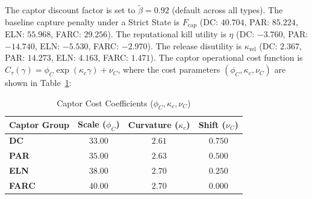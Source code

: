 \documentclass[12pt]{article}
\numberwithin{equation}{section}
\numberwithin{table}{section}
\begin{document}
The captor discount factor is set to $\tilde{\beta} = 0.92$ (default across all types). The baseline capture penalty under a Strict State is $F_{\text{cap}}$ (DC: $40.704$, PAR: $85.224$, ELN: $55.968$, FARC: $29.256$). The reputational kill utility is $\eta$ (DC: $-3.760$, PAR: $-14.740$, ELN: $-5.530$, FARC: $-2.970$). The release disutility is $\kappa_{\text{rel}}$ (DC: $2.367$, PAR: $14.273$, ELN: $4.163$, FARC: $1.471$). The captor operational cost function is $C_\tau(\gamma) = \phi_C \exp(\kappa_c \gamma) + \nu_C$, where the cost parameters $(\phi_C, \kappa_c, \nu_C)$ are shown in Table~\ref{tab:captor-cost-coefficients}:
\begin{table}[h!]
\centering
\caption{Captor Cost Coefficients ($\phi_C, \kappa_c, \nu_C$)}
\label{tab:captor-cost-coefficients}
\begin{tabular}{lccc}
\toprule
\textbf{Captor Group} & \textbf{Scale ($\phi_C$)} & \textbf{Curvature ($\kappa_c$)} & \textbf{Shift ($\nu_C$)} \\
\midrule
\textbf{DC} & $33.00$ & $2.61$ & $0.750$ \\
\textbf{PAR} & $35.00$ & $2.63$ & $0.500$ \\
\textbf{ELN} & $38.00$ & $2.70$ & $0.250$ \\
\textbf{FARC} & $40.00$ & $2.70$ & $0.000$ \\
\bottomrule
\end{tabular}
\end{table}
\end{document}
